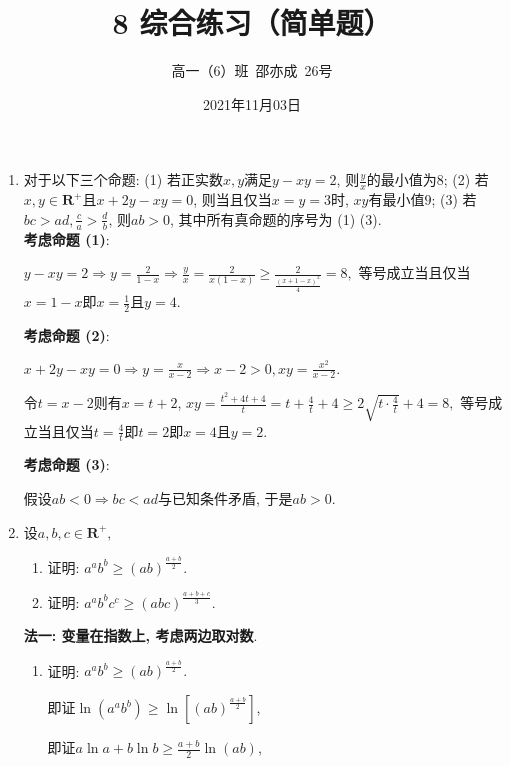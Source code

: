 \documentclass[8pt]{article}
\author{高一（6）班\ 邵亦成\ 26号}
\title{8 综合练习（简单题）}
\date{2021年11月03日}
\begin{document}
	\maketitle

	\begin{enumerate}[label=(\arabic*)]
		\item 对于以下三个命题: (1) 若正实数$x, y$满足$y-xy=2$, 则$\displaystyle \frac{y}{x}$的最小值为8; (2) 若$x, y\in\mathbf{R}^{+}$且$x+2y-xy=0$, 则当且仅当$x=y=3$时, $xy$有最小值$9$; (3) 若$bc>ad, \displaystyle \frac{c}{a}>\frac{d}{b}$, 则$ab>0$, 其中所有真命题的序号为 (1) (3).
			~\\

			\textbf{考虑命题 (1)}: 

				$y-xy=2 \Rightarrow y=\displaystyle \frac{2}{1-x} \Rightarrow \frac{y}{x}=\frac{2}{x(1-x)}\geq\frac{2}{\frac{(x+1-x)^2}{4}}=8,$ 等号成立当且仅当$x=1-x$即$x=\displaystyle \frac{1}{2}$且$y=4$.

			\textbf{考虑命题 (2)}:

				$\displaystyle x+2y-xy=0 \Rightarrow y=\frac{x}{x-2} \Rightarrow x-2>0, xy=\frac{x^2}{x-2}.$

				令$t=x-2$则有$x=t+2$, $\displaystyle xy=\frac{t^2+4t+4}{t}=t+\frac{4}{t}+4\geq2\sqrt{t\cdot\frac{4}{t}}+4=8,$ 等号成立当且仅当$\displaystyle t=\frac{4}{t}$即$t=2$即$x=4$且$y=2$.

			\textbf{考虑命题 (3)}:

				假设$ab<0 \Rightarrow bc<ad$与已知条件矛盾, 于是$ab>0$.

		\item 设$a, b, c\in\mathbf{R}^{+},$
			\begin{enumerate}[label=(\arabic*)]
				\item 证明: $a^ab^b\geq\displaystyle (ab)^{\frac{a+b}{2}}.$
				\item 证明: $a^ab^bc^c\geq\displaystyle (abc)^{\frac{a+b+c}{3}}.$
			\end{enumerate}

			\textbf{法一: 变量在指数上, 考虑两边取对数}.

			\begin{enumerate}[label=(\arabic*)]
				\item 证明: $a^ab^b\geq\displaystyle (ab)^{\frac{a+b}{2}}.$

					即证$\ln{(a^a b^b)}\geq\displaystyle \ln{\left[(ab)^{\frac{a+b}{2}}\right]}$,

					即证$a\ln{a}+b\ln{b}\geq\displaystyle \frac{a+b}{2}\ln{(ab)}$,


\end{enumerate}
\end{enumerate}
\end{document}
